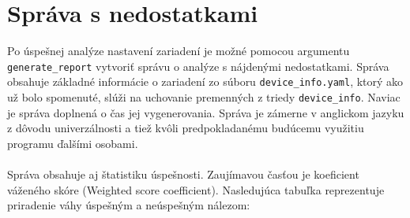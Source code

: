 \section{Správa s nedostatkami}
\label{sprava_nedostatky}
Po úspešnej analýze nastavení zariadení je možné pomocou argumentu \texttt{generate\_report} vytvoriť správu o analýze s nájdenými nedostatkami. Správa obsahuje základné informácie o zariadení zo súboru \texttt{device\_info.yaml}, ktorý ako už bolo spomenuté, slúži na uchovanie premenných z triedy \texttt{device\_info}. Naviac je správa doplnená o čas jej vygenerovania. Správa je zámerne v anglickom jazyku z dôvodu univerzálnosti a tiež kvôli predpokladanému budúcemu využitiu programu ďalšími osobami.
\\\\
\noindent
Správa obsahuje aj štatistiku úspešnosti. Zaujímavou časťou je koeficient váženého skóre (Weighted score coefficient). Nasledujúca tabuľka reprezentuje priradenie váhy úspešným a neúspešným nálezom: 

